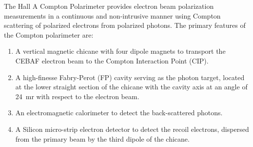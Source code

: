 
\vspace{40pt}
\newcommand{\dis}{\displaystyle}
\newcommand{\nn}{\nonumber}
\newcommand{\aexp}{A_{exp}}
\newcommand{\araw}{A_{raw}}
\newcommand{\ath}{A_{{th}}}
\newcommand{\ac}{A_{{c}}}
\newcommand{\af}{A_{{F}}}
\newcommand{\pe}{P_{{e}}}
\newcommand{\pg}{P_{\gamma}}
\newcommand{\np}{N^{+}}
\newcommand{\nm}{N^{-}}
\newcommand{\kp}{k^{\prime}}
\newcommand{\krs}{k^{\prime s}_{r}}
\newcommand{\sigrs}{\sigma^{s}_{r}}
\newcommand{\sigc}{\sigma_{c}}
\newcommand{\kmax}{k^{\prime}_{max}}
\newcommand{\wer}{\omega_R}
\newcommand{\wel}{\omega_L}



The Hall A Compton
Polarimeter provides  electron beam polarization measurements in a continuous and non-intrusive manner
using  Compton scattering of polarized electrons from polarized photons.  The primary features of the Compton polarimeter are:
\begin{enumerate}
\item A vertical magnetic chicane with  four dipole magnets to transport  the CEBAF electron beam to the Compton Interaction Point (CIP).
\item A high-finesse Fabry-Perot (FP) cavity serving as the photon target, located at the lower straight section of the chicane with the cavity axis at  an angle of 24~mr with respect to  the electron beam.  
\item An electromagnetic calorimeter to detect the  back-scattered photons.
\item A Silicon micro-strip electron detector to detect the recoil electrons, dispersed  from the 
primary beam by the third dipole of the chicane.
\end{enumerate}

